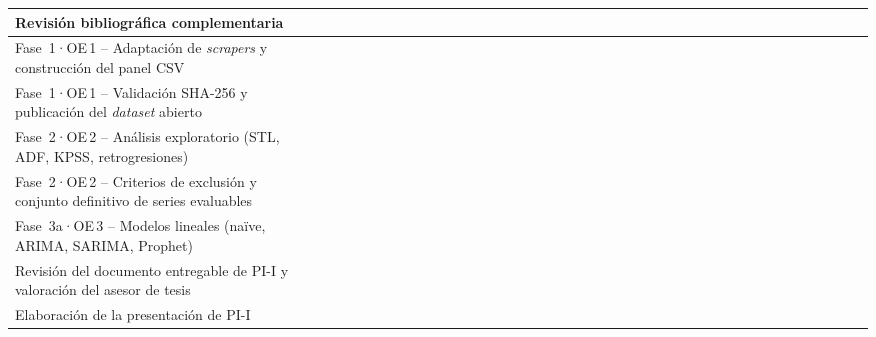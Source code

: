 \documentclass[12pt,letterpaper]{report}
\begin{document}
\begin{landscape}
\begin{minipage}[c][\textheight][c]{\linewidth}
{\begin{tabular}{|>{\raggedright\arraybackslash}p{4.6cm}|*{10}{cccc|}}
        Revisión bibliográfica complementaria
        & \cellcolor{uacjblue!50} & \cellcolor{uacjblue!50} & \cellcolor{uacjblue!50} & \cellcolor{uacjblue!50} & \cellcolor{uacjblue!50} & \cellcolor{uacjblue!50} &  &  &  &  &  &  &  &  &  &  &  &  &  &  &  &  &  &  &  &  &  &  &  &  &  &  &  &  &  &  &  &  &  &  \\
        \hline
        Fase~1·OE\,1 -- Adaptación de \textit{scrapers} y construcción del panel CSV
        & \cellcolor{uacjblue!70} & \cellcolor{uacjblue!70} & \cellcolor{uacjblue!70} & \cellcolor{uacjblue!70} & \cellcolor{uacjblue!70} & \cellcolor{uacjblue!70} & \cellcolor{uacjblue!70} &  &  &  &  &  &  &  &  &  &  &  &  &  &  &  &  &  &  &  &  &  &  &  &  &  &  &  &  &  &  &  &  &  \\
        \hline
        Fase~1·OE\,1 -- Validación SHA-256 y publicación del \textit{dataset} abierto
        &  &  &  &  &  &  & \cellcolor{uacjyellow!85} & \cellcolor{uacjyellow!85} &  &  &  &  &  &  &  &  &  &  &  &  &  &  &  &  &  &  &  &  &  &  &  &  &  &  &  &  &  &  &  &  \\
        \hline
        Fase~2·OE\,2 -- Análisis exploratorio (STL, ADF, KPSS, retrogresiones)
        &  &  &  &  &  & \cellcolor{uacjblue!70} & \cellcolor{uacjblue!70} & \cellcolor{uacjblue!70} & \cellcolor{uacjblue!70} & \cellcolor{uacjblue!70} & \cellcolor{uacjblue!70} & \cellcolor{uacjblue!70} &  &  &  &  &  &  &  &  &  &  &  &  &  &  &  &  &  &  &  &  &  &  &  &  &  &  &  &  \\
        \hline
        Fase~2·OE\,2 -- Criterios de exclusión y conjunto definitivo de series evaluables
        &  &  &  &  &  &  &  &  &  &  & \cellcolor{uacjyellow!85} & \cellcolor{uacjyellow!85} & \cellcolor{uacjyellow!85} &  &  &  &  &  &  &  &  &  &  &  &  &  &  &  &  &  &  &  &  &  &  &  &  &  &  &  \\
        \hline
        Fase~3a·OE\,3 -- Modelos lineales (naïve, ARIMA, SARIMA, Prophet)
        &  &  &  &  &  &  &  &  &  &  & \cellcolor{uacjblue!70} & \cellcolor{uacjblue!70} & \cellcolor{uacjblue!70} & \cellcolor{uacjblue!70} & \cellcolor{uacjblue!70} &  &  &  &  &  &  &  &  &  &  &  &  &  &  &  &  &  &  &  &  &  &  &  &  &  \\
        \hline
        Revisión del documento entregable de PI-I y valoración del asesor de tesis
        &  &  &  &  &  &  &  &  &  &  &  &  &  &  & \cellcolor{uacjyellow!85} & \cellcolor{uacjyellow!85} &  &  &  &  &  &  &  &  &  &  &  &  &  &  &  &  &  &  &  &  &  &  &  &  \\
        \hline
        Elaboración de la presentación de PI-I
        &  &  &  &  &  &  &  &  &  &  &  &  &  &  &  & \cellcolor{uacjyellow!85} &  &  &  &  &  &  &  &  &  &  &  &  &  &  &  &  &  &  &  &  &  &  &  &  \\
        \hline


\end{tabular}}
\end{minipage}
\end{landscape}
\end{document}
